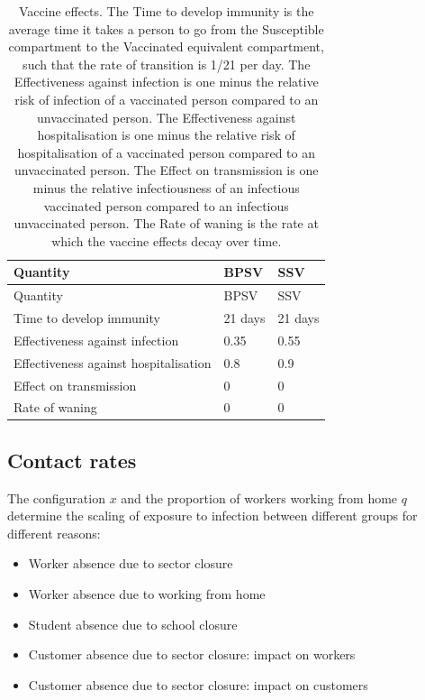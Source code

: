 \documentclass[
]{article}
\providecommand{\tightlist}{%
  \setlength{\itemsep}{0pt}\setlength{\parskip}{0pt}}
\begin{document}
\begin{longtable}[]{@{}lll@{}}
\caption{\label{tab:vaccineeffects} Vaccine effects. The Time to develop immunity is the average time it takes a person to go from the Susceptible compartment to the Vaccinated equivalent compartment, such that the rate of transition is 1/21 per day. The Effectiveness against infection is one minus the relative risk of infection of a vaccinated person compared to an unvaccinated person. The Effectiveness against hospitalisation is one minus the relative risk of hospitalisation of a vaccinated person compared to an unvaccinated person. The Effect on transmission is one minus the relative infectiousness of an infectious vaccinated person compared to an infectious unvaccinated person. The Rate of waning is the rate at which the vaccine effects decay over time.}\tabularnewline
\toprule\noalign{}
Quantity & BPSV & SSV \\
\midrule\noalign{}
\endfirsthead
\toprule\noalign{}
Quantity & BPSV & SSV \\
\midrule\noalign{}
\endhead
\bottomrule\noalign{}
\endlastfoot
Time to develop immunity & 21 days & 21 days \\
Effectiveness against infection & 0.35 & 0.55 \\
Effectiveness against hospitalisation & 0.8 & 0.9 \\
Effect on transmission & 0 & 0 \\
Rate of waning & 0 & 0 \\
\end{longtable}

\subsection{Contact rates}\label{contact-rates}

The configuration \(x\) and the proportion of workers working from home \(q\) determine the scaling of exposure to infection between different groups for different reasons:

\begin{itemize}
\tightlist
\item
  Worker absence due to sector closure
\item
  Worker absence due to working from home
\item
  Student absence due to school closure
\item
  Customer absence due to sector closure: impact on workers
\item
  Customer absence due to sector closure: impact on customers
\end{itemize}
\end{document}
